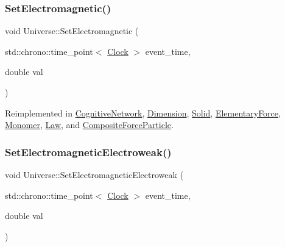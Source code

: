 \mbox{\label{classUniverse_aa981fc7e252b1fbbb675f0371860954d}} 
\subsubsection{\texorpdfstring{Set\+Electromagnetic()}{SetElectromagnetic()}}
{\footnotesize\ttfamily void Universe\+::\+Set\+Electromagnetic (\begin{DoxyParamCaption}\item[{std\+::chrono\+::time\+\_\+point$<$ \mbox{\hyperlink{universe_8h_a0ef8d951d1ca5ab3cfaf7ab4c7a6fd80}{Clock}} $>$}]{event\+\_\+time,  }\item[{double}]{val }\end{DoxyParamCaption})\hspace{0.3cm}{\ttfamily [virtual]}}



Reimplemented in \mbox{\hyperlink{classCognitiveNetwork_a31764cd5746369d16b45f2ff74806a0b}{Cognitive\+Network}}, \mbox{\hyperlink{classDimension_ad8c18ce6358904e01594092dca9f1311}{Dimension}}, \mbox{\hyperlink{classSolid_a9a660f9d94f597712c67922aa1d4d795}{Solid}}, \mbox{\hyperlink{classElementaryForce_a67f6845bd715c29c17387d291b343a1b}{Elementary\+Force}}, \mbox{\hyperlink{classMonomer_a50e41be601b31450a97bfd15950cfb3d}{Monomer}}, \mbox{\hyperlink{classLaw_acabe1a3113c207368f3bb6fe81e13963}{Law}}, and \mbox{\hyperlink{classCompositeForceParticle_a476c0d570c3be75c9e186df1ec2a5cda}{Composite\+Force\+Particle}}.

\mbox{\label{classUniverse_a608aa95698380f791a0ffba45cc1bee3}} 
\subsubsection{\texorpdfstring{Set\+Electromagnetic\+Electroweak()}{SetElectromagneticElectroweak()}}
{\footnotesize\ttfamily void Universe\+::\+Set\+Electromagnetic\+Electroweak (\begin{DoxyParamCaption}\item[{std\+::chrono\+::time\+\_\+point$<$ \mbox{\hyperlink{universe_8h_a0ef8d951d1ca5ab3cfaf7ab4c7a6fd80}{Clock}} $>$}]{event\+\_\+time,  }\item[{double}]{val }\end{DoxyParamCaption})\hspace{0.3cm}{\ttfamily [virtual]}}



